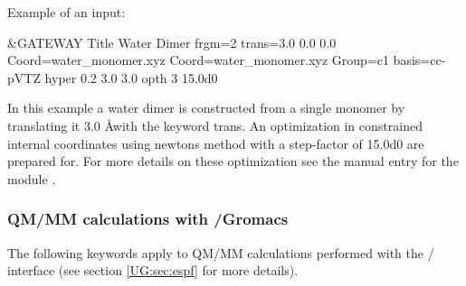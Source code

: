 Example of an input:
\begin{inputlisting}
 &GATEWAY
Title
Water Dimer
frgm=2
trans=3.0 0.0 0.0
Coord=water_monomer.xyz
Coord=water_monomer.xyz
Group=c1
basis=cc-pVTZ
hyper
0.2 3.0 3.0
opth
3
15.0d0
\end{inputlisting}

In this example a water dimer is constructed from a single monomer by translating
it 3.0 \AA with the keyword trans. An optimization in constrained internal
coordinates using newtons method with a step-factor of 15.0d0 are prepared for. For
more details on these optimization see the manual entry for the module
.

\subsubsection{QM/MM calculations with \molcas/Gromacs}

The following keywords apply to QM/MM calculations performed with the \molcas/ interface (see section \ref{UG:sec:espf} for more details).

